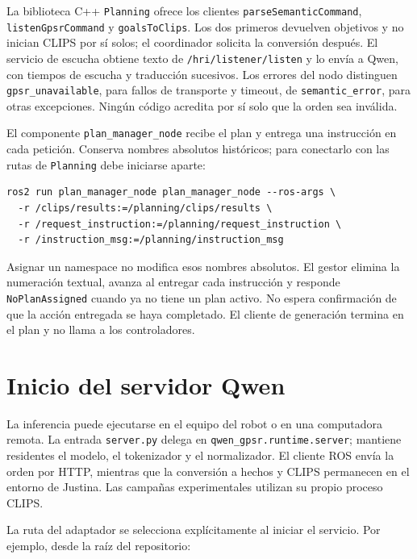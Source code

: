 La biblioteca C++ \texttt{Planning} ofrece los clientes
\texttt{parse\allowbreak Semantic\allowbreak Command}, \texttt{listen\allowbreak Gpsr\allowbreak Command} y
\texttt{goalsToClips}. Los dos primeros devuelven objetivos y no inician
CLIPS por sí solos; el coordinador solicita la conversión después.
El servicio de escucha obtiene texto de \texttt{/\allowbreak hri/\allowbreak listener/\allowbreak listen}
y lo envía a Qwen, con tiempos de escucha y traducción sucesivos.
Los errores del nodo distinguen \texttt{gpsr\_\allowbreak unavailable}, para fallos
de transporte y timeout, de \texttt{semantic\_\allowbreak error}, para otras
excepciones. Ningún código acredita por sí solo que la orden sea inválida.

El componente \texttt{plan\_\allowbreak manager\_\allowbreak node} recibe el plan y entrega
una instrucción en cada petición. Conserva nombres absolutos históricos;
para conectarlo con las rutas de \texttt{Planning} debe iniciarse aparte:

{\small
\begin{verbatim}
ros2 run plan_manager_node plan_manager_node --ros-args \
  -r /clips/results:=/planning/clips/results \
  -r /request_instruction:=/planning/request_instruction \
  -r /instruction_msg:=/planning/instruction_msg
\end{verbatim}
}

Asignar un namespace no modifica esos nombres absolutos. El gestor
elimina la numeración textual, avanza al entregar cada instrucción y
responde \texttt{No\allowbreak Plan\allowbreak Assigned} cuando ya no tiene un plan activo.
No espera confirmación de que la acción entregada se haya completado.
El cliente de generación termina en el plan y no llama a los controladores.



\section{Inicio del servidor Qwen}

La inferencia puede ejecutarse en el equipo del robot o en una computadora
remota. La entrada \texttt{server.py} delega en
\texttt{qwen\_\allowbreak gpsr.\allowbreak runtime.\allowbreak server}; mantiene residentes el modelo,
el tokenizador y el normalizador. El cliente ROS envía la orden por HTTP,
mientras que la conversión a hechos y CLIPS permanecen en el entorno de
Justina. Las campañas experimentales utilizan su propio proceso CLIPS.

La ruta del adaptador se selecciona explícitamente al iniciar el servicio.
Por ejemplo, desde la raíz del repositorio:

